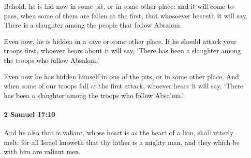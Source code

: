 			\begin{versebox}
					\item[BHS] 
					\item[ASV] Behold, he is hid now in some pit, or in some other place: and it will come to pass, when some of them are fallen at the first, that whosoever heareth it will say, There is a slaughter among the people that follow Absalom.
					\item[NIV] Even now, he is hidden in a cave or some other place. If he should attack your troops first, whoever hears about it will say, ‘There has been a slaughter among the troops who follow Absalom.’
					\item[NRSV] Even now he has hidden himself in one of the pits, or in some other place. And when some of our troops fall at the first attack, whoever hears it will say, ‘There has been a slaughter among the troops who follow Absalom.’
			\end{versebox}

		\paragraph{2 Samuel 17:10} %
			\label{2SAMUEL-17-10}

			And he also that is valiant, whose heart is as the heart of a lion, shall utterly melt: for all Israel knoweth that thy father is a mighty man, and they which be with him are valiant men.

